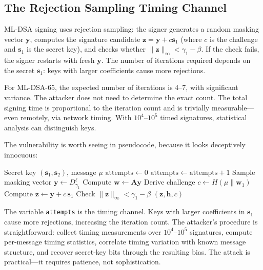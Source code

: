 \subsection{The Rejection Sampling Timing Channel}
\label{subsec:rejection-sampling}

ML-DSA signing uses rejection sampling: the signer generates a random masking vector $\mathbf{y}$, computes the signature candidate $\mathbf{z} = \mathbf{y} + c\mathbf{s}_1$ (where $c$ is the challenge and $\mathbf{s}_1$ is the secret key), and checks whether $\|\mathbf{z}\|_\infty < \gamma_1 - \beta$.  If the check fails, the signer restarts with fresh $\mathbf{y}$.  The number of iterations required depends on the secret $\mathbf{s}_1$: keys with larger coefficients cause more rejections.

For ML-DSA-65, the expected number of iterations is 4--7, with significant variance.  The attacker does not need to determine the exact count.  The total signing time is proportional to the iteration count and is trivially measurable---even remotely, via network timing.  With $10^4$--$10^5$ timed signatures, statistical analysis can distinguish keys.

The vulnerability is worth seeing in pseudocode, because it looks deceptively innocuous:

\begin{algorithm}[h]
\caption{ML-DSA signing with timing leak}
\label{alg:mldsa-timing-leak}
\begin{algorithmic}[1]
\Require Secret key $(\mathbf{s}_1, \mathbf{s}_2)$, message $\mu$
\State $\text{attempts} \gets 0$
\Repeat
    \State $\text{attempts} \gets \text{attempts} + 1$
    \State Sample masking vector $\mathbf{y} \gets D_{\gamma_1}^{\ell}$
    \State Compute $\mathbf{w} \gets \mathbf{A}\mathbf{y}$
    \State Derive challenge $c \gets H(\mu \| \mathbf{w}_1)$
    \State Compute $\mathbf{z} \gets \mathbf{y} + c\,\mathbf{s}_1$ 
    \State Check $\|\mathbf{z}\|_\infty < \gamma_1 - \beta$ 
\State \Return $(\mathbf{z}, \mathbf{h}, c)$ 
\end{algorithmic}
\end{algorithm}

The variable \texttt{attempts} is the timing channel.  Keys with larger coefficients in $\mathbf{s}_1$ cause more rejections, increasing the iteration count.  The attacker's procedure is straightforward: collect timing measurements over $10^4$--$10^5$ signatures, compute per-message timing statistics, correlate timing variation with known message structure, and recover secret-key bits through the resulting bias.  The attack is practical---it requires patience, not sophistication.

